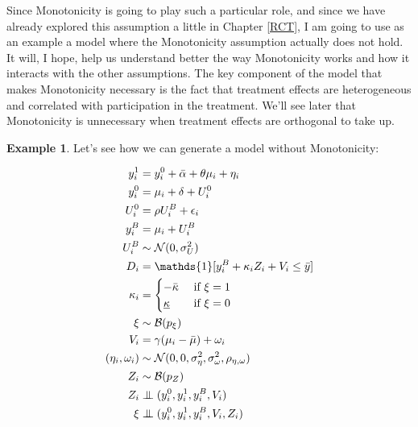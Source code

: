 \documentclass[
]{book}
\newcommand{\uns}[1]{\mathds{1}[ #1 ]}
\newcommand\Ind{\protect\mathpalette{\protect\independenT}{\perp}}
\def\independenT#1#2{\mathrel{\setbox0\hbox{$#1#2$}\copy0\kern-\wd0\mkern4mu\box0}}
\theoremstyle{definition}
\theoremstyle{definition}
\newtheorem{example}{Example}[chapter]
\theoremstyle{definition}
\theoremstyle{definition}
\theoremstyle{remark}
\begin{document}
Since Monotonicity is going to play such a particular role, and since we have already explored this assumption a little in Chapter \ref{RCT}, I am going to use as an example a model where the Monotonicity assumption actually does not hold.
It will, I hope, help us understand better the way Monotonicity works and how it interacts with the other assumptions.
The key component of the model that makes Monotonicity necessary is the fact that treatment effects are heterogeneous and correlated with participation in the treatment.
We'll see later that Monotonicity is unnecessary when treatment effects are orthogonal to take up.

\begin{example}
\protect\hypertarget{exm:unnamed-chunk-139}{}{\label{exm:unnamed-chunk-139} }Let's see how we can generate a model without Monotonicity:
\end{example}

\begin{align*}
y_i^1 & = y_i^0+\bar{\alpha}+\theta\mu_i+\eta_i \\
y_i^0 & = \mu_i+\delta+U_i^0 \\
U_i^0 & = \rho U_i^B+\epsilon_i \\
y_i^B & =\mu_i+U_i^B \\
U_i^B & \sim\mathcal{N}(0,\sigma^2_{U}) \\
D_i   & = \uns{y_i^B+\kappa_i Z_i + V_i\leq\bar{y}} \\
\kappa_i & = 
\begin{cases}
-\bar{\kappa} & \text{ if } \xi = 1 \\
\underline{\kappa} & \text{ if } \xi = 0
\end{cases} \\
\xi & \sim\mathcal{B}(p_{\xi}) \\
V_i   & = \gamma(\mu_i-\bar{\mu}) + \omega_i \\
(\eta_i,\omega_i) & \sim\mathcal{N}(0,0,\sigma^2_{\eta},\sigma^2_{\omega},\rho_{\eta,\omega}) \\
Z_i   & \sim\mathcal{B}(p_Z) \\
Z_i   & \Ind (y_i^0,y_i^1,y_i^B,V_i) \\
\xi & \Ind (y_i^0,y_i^1,y_i^B,V_i,Z_i)
\end{align*}
\end{document}
